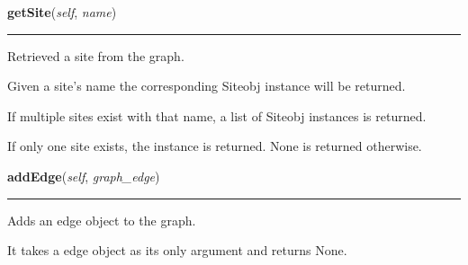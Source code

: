     \label{Epigrass:simobj:graph:getSite}

    \vspace{0.5ex}

    \begin{boxedminipage}{\textwidth}

    \raggedright \textbf{getSite}(\textit{self}, \textit{name})

    \vspace{-1.5ex}

    \rule{\textwidth}{0.5\fboxrule}
    Retrieved a site from the graph.

    Given a site's name the corresponding Siteobj instance will be 
    returned.

    If multiple sites exist with that name, a list of Siteobj instances is 
    returned.

    If only one site exists, the instance is returned. None is returned 
    otherwise.

    \vspace{1ex}

    \end{boxedminipage}

    \label{Epigrass:simobj:graph:addEdge}

    \vspace{0.5ex}

    \begin{boxedminipage}{\textwidth}

    \raggedright \textbf{addEdge}(\textit{self}, \textit{graph\_edge})

    \vspace{-1.5ex}

    \rule{\textwidth}{0.5\fboxrule}
    Adds an edge object to the graph.

    It takes a edge object as its only argument and returns None.

    \vspace{1ex}

    \end{boxedminipage}

    \label{Epigrass:simobj:graph:getGraphdict}

